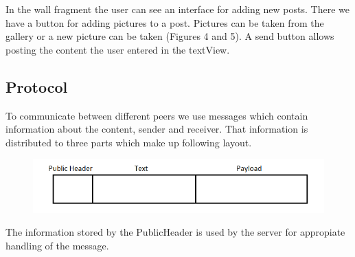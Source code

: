 \documentclass{report}
\newcommand{\lfig}[1]{\label{fig:#1}}
\begin{document}
In the wall fragment the user can see an interface for adding new posts. There we have a button for adding pictures to a post. Pictures can be taken from the gallery or a new picture can be taken (Figures 4 and 5). A send button allows posting the content the user entered in the textView. \begin{figure}[H]
	\centering
	\hfill
	\hfill
	
\end{figure}

\subsection{Protocol}

To communicate between different peers we use messages which contain information about the content, sender and receiver. That information is distributed to three parts which make up following layout.
\begin{figure}[H]

	\centering
    \includegraphics[width=\columnwidth]{Layout.png}
    \lfig{Layout}
    \vspace{-5mm} %
\end{figure}
The information stored by the PublicHeader is used by the server for appropiate handling of the message.  \newline
\end{document}
